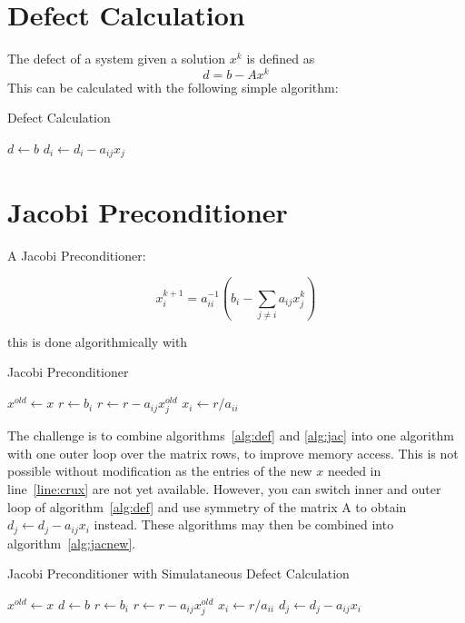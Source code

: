 \documentclass{article}
\begin{document}
\section{Defect Calculation}

The defect of a system given a solution $x^k$ is defined as 
\begin{equation}
d=b-Ax^k
\end{equation}
This can be calculated with the following simple algorithm:
\begin{algorithm}
\caption{Defect Calculation}
\label{alg:def}
\begin{algorithmic}[1]
\State $d\gets b$
    \State $d_i\gets d_i-a_{ij}x_j$ \label{line:crux}
  \EndFor
\EndFor
\end{algorithmic}
\end{algorithm}

\section{Jacobi Preconditioner}

A Jacobi Preconditioner:

\begin{equation}
x_i^{k+1}=a_{ii}^{-1}\left(b_i-\sum_{j\neq i}a_{ij}x_j^k\right)
\end{equation}

this is done algorithmically with
\begin{algorithm}
\caption{Jacobi Preconditioner}
\label{alg:jac}
\begin{algorithmic}[1]
\State $x^{old}\gets x$
  \State $r\gets b_i$
    \State $r \gets r - a_{ij}x_j^{old}$
  \EndFor
  \State $x_i \gets r/a_{ii}$
\EndFor
\end{algorithmic}
\end{algorithm}

The challenge is to combine algorithms~\ref{alg:def} and \ref{alg:jac} into one algorithm with one outer loop over the matrix rows, to improve memory access. This is not possible without modification as the entries of the new $x$ needed in line~\ref{line:crux} are not yet available. However, you can switch inner and outer loop of algorithm~\ref{alg:def} and use symmetry of the matrix A to obtain $d_j\gets d_j-a_{ij}x_i$ instead. These algorithms may then be combined into algorithm~\ref{alg:jacnew}.
\begin{algorithm}
\caption{Jacobi Preconditioner with Simulataneous Defect Calculation}
\label{alg:jacnew}
\begin{algorithmic}[1]
\State $x^{old}\gets x$
\State $d\gets b$
  \State $r\gets b_i$
    \State $r \gets r - a_{ij}x_j^{old}$
  \EndFor
  \State $x_i \gets r/a_{ii}$
    \State $d_j\gets d_j-a_{ij}x_i$
  \EndFor
\EndFor
\end{algorithmic}
\end{algorithm}
\end{document}
